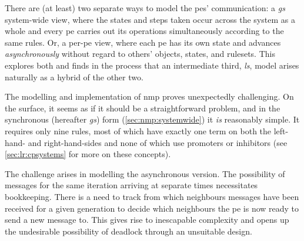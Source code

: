 There are (at least) two separate ways to model the \glspl{pe}' communication:  a \emph{\gls{gs}} system-wide view, where the states and steps taken occur across the system as a whole and every \gls{pe} carries out its operations simultaneously according to the same rules.  Or, a per-\gls{pe} view, where each \gls{pe} has its own state and advances \emph{asynchronously} without regard to others' objects, states, and rulesets.  This  explores both and finds in the process that an intermediate third, \emph{\gls{ls}}, model arises naturally as a hybrid of the other two.

The modelling and implementation of \gls{nmp} proves unexpectedly challenging.  On the surface, it seems as if it should be a straightforward problem, and in the synchronous (hereafter \emph{\gls{gs}}) form (\cref{sec:nmp:systemwide}) it \emph{is} reasonably simple.  It requires only nine rules, most of which have exactly one term on both the left-hand- and right-hand-sides and none of which use promoters or inhibitors (see \cref{sec:lr:cpsystems} for more on these concepts).

The challenge arises in modelling the asynchronous version.  The possibility of messages for the same iteration arriving at separate times necessitates bookkeeping.  There is a need to track from which neighbours messages have been received for a given generation to decide which neighbours the \gls{pe} is now ready to send a new message to.  This gives rise to inescapable complexity and opens up the undesirable possibility of deadlock through an unsuitable design.


